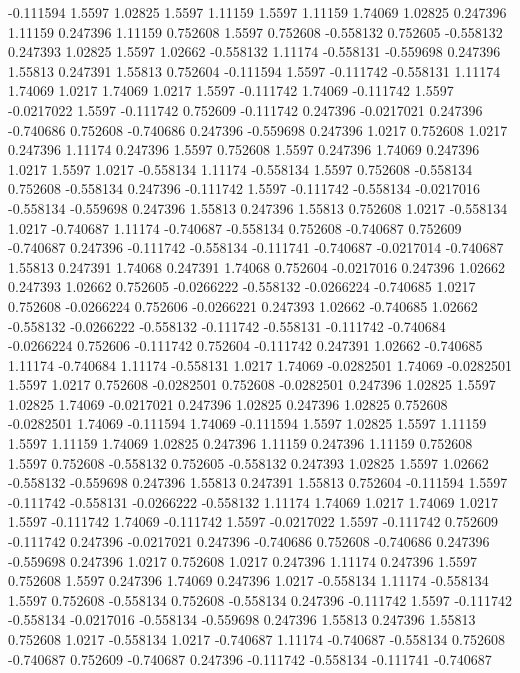 -0.111594 1.5597
1.02825 1.5597
1.11159 1.5597
1.11159 1.74069
1.02825 0.247396
1.11159 0.247396
1.11159 0.752608
1.5597 0.752608
-0.558132 0.752605
-0.558132 0.247393
1.02825 1.5597
1.02662 -0.558132
1.11174 -0.558131
-0.559698 0.247396
1.55813 0.247391
1.55813 0.752604
-0.111594 1.5597
-0.111742 -0.558131
1.11174 1.74069
1.0217 1.74069
1.0217 1.5597
-0.111742 1.74069
-0.111742 1.5597
-0.0217022 1.5597
-0.111742 0.752609
-0.111742 0.247396
-0.0217021 0.247396
-0.740686 0.752608
-0.740686 0.247396
-0.559698 0.247396
1.0217 0.752608
1.0217 0.247396
1.11174 0.247396
1.5597 0.752608
1.5597 0.247396
1.74069 0.247396
1.0217 1.5597
1.0217 -0.558134
1.11174 -0.558134
1.5597 0.752608
-0.558134 0.752608
-0.558134 0.247396
-0.111742 1.5597
-0.111742 -0.558134
-0.0217016 -0.558134
-0.559698 0.247396
1.55813 0.247396
1.55813 0.752608
1.0217 -0.558134
1.0217 -0.740687
1.11174 -0.740687
-0.558134 0.752608
-0.740687 0.752609
-0.740687 0.247396
-0.111742 -0.558134
-0.111741 -0.740687
-0.0217014 -0.740687
1.55813 0.247391
1.74068 0.247391
1.74068 0.752604
-0.0217016 0.247396
1.02662 0.247393
1.02662 0.752605
-0.0266222 -0.558132
-0.0266224 -0.740685
1.0217 0.752608
-0.0266224 0.752606
-0.0266221 0.247393
1.02662 -0.740685
1.02662 -0.558132
-0.0266222 -0.558132
-0.111742 -0.558131
-0.111742 -0.740684
-0.0266224 0.752606
-0.111742 0.752604
-0.111742 0.247391
1.02662 -0.740685
1.11174 -0.740684
1.11174 -0.558131
1.0217 1.74069
-0.0282501 1.74069
-0.0282501 1.5597
1.0217 0.752608
-0.0282501 0.752608
-0.0282501 0.247396
1.02825 1.5597
1.02825 1.74069
-0.0217021 0.247396
1.02825 0.247396
1.02825 0.752608
-0.0282501 1.74069
-0.111594 1.74069
-0.111594 1.5597
1.02825 1.5597
1.11159 1.5597
1.11159 1.74069
1.02825 0.247396
1.11159 0.247396
1.11159 0.752608
1.5597 0.752608
-0.558132 0.752605
-0.558132 0.247393
1.02825 1.5597
1.02662 -0.558132
-0.559698 0.247396
1.55813 0.247391
1.55813 0.752604
-0.111594 1.5597
-0.111742 -0.558131
-0.0266222 -0.558132
1.11174 1.74069
1.0217 1.74069
1.0217 1.5597
-0.111742 1.74069
-0.111742 1.5597
-0.0217022 1.5597
-0.111742 0.752609
-0.111742 0.247396
-0.0217021 0.247396
-0.740686 0.752608
-0.740686 0.247396
-0.559698 0.247396
1.0217 0.752608
1.0217 0.247396
1.11174 0.247396
1.5597 0.752608
1.5597 0.247396
1.74069 0.247396
1.0217 -0.558134
1.11174 -0.558134
1.5597 0.752608
-0.558134 0.752608
-0.558134 0.247396
-0.111742 1.5597
-0.111742 -0.558134
-0.0217016 -0.558134
-0.559698 0.247396
1.55813 0.247396
1.55813 0.752608
1.0217 -0.558134
1.0217 -0.740687
1.11174 -0.740687
-0.558134 0.752608
-0.740687 0.752609
-0.740687 0.247396
-0.111742 -0.558134
-0.111741 -0.740687
